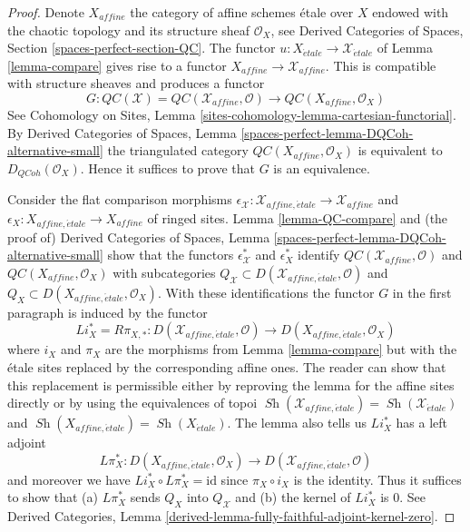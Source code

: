 \documentclass[10pt,a4paper]{amsart}
\theoremstyle{plain}
\theoremstyle{definition}
\theoremstyle{remark}
\numberwithin{equation}{subsection}
\def\Sh{\mathop{\mathit{Sh}}\nolimits}
\def\etale{{\acute{e}tale}}
\def\QCoh{\mathit{QCoh}}
\begin{document}
\begin{proof}
Denote $X_{affine}$ the category of affine schemes \'etale over $X$
endowed with the chaotic topology and its structure sheaf $\mathcal{O}_X$, see
Derived Categories of Spaces, Section \ref{spaces-perfect-section-QC}.
The functor $u : X_\etale \to \mathcal{X}_\etale$ of Lemma \ref{lemma-compare}
gives rise to a functor $X_{affine} \to \mathcal{X}_{affine}$.
This is compatible with structure sheaves and produces a functor
$$
G :
\mathit{QC}(\mathcal{X}) = \mathit{QC}(\mathcal{X}_{affine}, \mathcal{O})
\longrightarrow
\mathit{QC}(X_{affine}, \mathcal{O}_X)
$$
See
Cohomology on Sites, Lemma \ref{sites-cohomology-lemma-cartesian-functorial}.
By Derived Categories of Spaces, Lemma
\ref{spaces-perfect-lemma-DQCoh-alternative-small}
the triangulated category $\mathit{QC}(X_{affine}, \mathcal{O}_X)$
is equivalent to $D_\QCoh(\mathcal{O}_X)$. Hence it suffices to
prove that $G$ is an equivalence.

\medskip\noindent
Consider the flat comparison morphisms
$\epsilon_\mathcal{X} : \mathcal{X}_{affine, \etale} \to \mathcal{X}_{affine}$
and $\epsilon_X : X_{affine, \etale} \to X_{affine}$
of ringed sites. Lemma \ref{lemma-QC-compare} and
(the proof of) Derived Categories of Spaces, Lemma
\ref{spaces-perfect-lemma-DQCoh-alternative-small}
show that the functors
$\epsilon_\mathcal{X}^*$ and $\epsilon_X^*$
identify $\mathit{QC}(\mathcal{X}_{affine}, \mathcal{O})$
and $\mathit{QC}(X_{affine}, \mathcal{O}_X)$
with subcategories
$Q_\mathcal{X} \subset D(\mathcal{X}_{affine, \etale}, \mathcal{O})$
and
$Q_X \subset D(X_{affine, \etale}, \mathcal{O}_X)$.
With these identifications
the functor $G$ in the first paragraph is induced by the functor
$$
Li_X^* = R\pi_{X, *}:
D(\mathcal{X}_{affine, \etale}, \mathcal{O})
\longrightarrow
D(X_{affine, \etale}, \mathcal{O}_X)
$$
where $i_X$ and $\pi_X$ are the morphisms from Lemma \ref{lemma-compare}
but with the \'etale sites replaced by the corresponding affine ones.
The reader can show that this replacement is permissible either
by reproving the lemma for the affine sites directly or
by using the equivalences of topoi
$\Sh(\mathcal{X}_{affine, \etale}) = \Sh(\mathcal{X}_\etale)$ and
$\Sh(X_{affine, \etale}) = \Sh(X_\etale)$.
The lemma also tells us $Li_X^*$ has a left adjoint
$$
L\pi_X^*:
D(X_{affine, \etale}, \mathcal{O}_X)
\longrightarrow
D(\mathcal{X}_{affine, \etale}, \mathcal{O})
$$
and moreover we have $Li_X^* \circ L\pi_X^* = \text{id}$
since $\pi_X \circ i_X$ is the identity. Thus it suffices
to show that (a) $L\pi_X^*$ sends $Q_X$ into $Q_\mathcal{X}$
and (b) the kernel of $Li_X^*$ is $0$.
See Derived Categories, Lemma
\ref{derived-lemma-fully-faithful-adjoint-kernel-zero}.


\end{proof}
\end{document}
